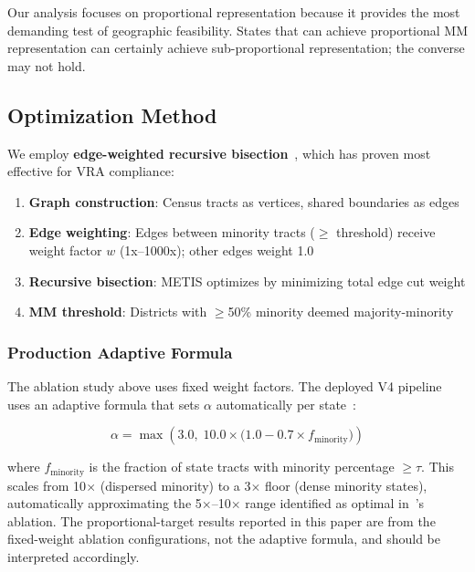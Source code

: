 Our analysis focuses on proportional representation because it provides the most demanding test of geographic feasibility. States that can achieve proportional MM representation can certainly achieve sub-proportional representation; the converse may not hold.

\subsection{Optimization Method}

We employ \textbf{edge-weighted recursive bisection}~\citep{dellaLibera2026edgeWeighted}, which has proven most effective for VRA compliance:

\begin{enumerate}
    \item \textbf{Graph construction}: Census tracts as vertices, shared boundaries as edges
    \item \textbf{Edge weighting}: Edges between minority tracts ($\geq$ threshold) receive weight factor $w$ (1x--1000x); other edges weight 1.0
    \item \textbf{Recursive bisection}: METIS optimizes by minimizing total edge cut weight
    \item \textbf{MM threshold}: Districts with $\geq$50\% minority deemed majority-minority
\end{enumerate}

\subsubsection{Production Adaptive Formula}

The ablation study above uses fixed weight factors. The deployed V4 pipeline uses an adaptive formula that sets $\alpha$ automatically per state~\citep{dellaLibera2026D0}:

\begin{equation}
\alpha = \max\!\left(3.0,\; 10.0 \times \bigl(1.0 - 0.7 \times f_{\text{minority}}\bigr)\right)
\label{eq:adaptive_boost_d1}
\end{equation}

where $f_{\text{minority}}$ is the fraction of state tracts with minority percentage $\geq \tau$. This scales from 10$\times$ (dispersed minority) to a 3$\times$ floor (dense minority states), automatically approximating the 5$\times$--10$\times$ range identified as optimal in~\citeauthor{dellaLibera2026D0}'s ablation. The proportional-target results reported in this paper are from the fixed-weight ablation configurations, not the adaptive formula, and should be interpreted accordingly.

